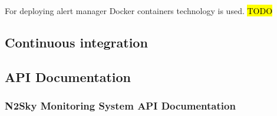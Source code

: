For deploying alert manager Docker containers technology is used.
\hl{TODO}

\subsection{Continuous integration}\label{Continuous integration}
\subsection{API Documentation}\label{API Documentation}
\subsubsection{N2Sky Monitoring System API Documentation}\label{N2Sky Monitoring System API Documentation}

